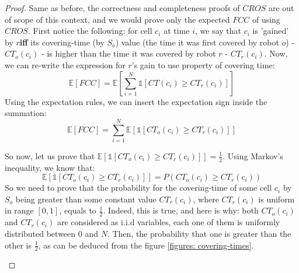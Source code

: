 \documentclass[letterpaper, 10 pt, conference]{ieeeconf}  %
\newtheorem{theorem}{Theorem}[section]
\newcommand\rob{\ensuremath{r}\xspace}
\newcommand\opp{\ensuremath{o}\xspace}
\newcommand{\fcc}{\ensuremath{FCC}\xspace}
\newcommand{\cros}{\ensuremath{CROS}\xspace}
\begin{document}
\begin{proof}
Same as before, the correctness and completeness proofs of \cros are out of scope of this context, and we would prove only the expected \fcc of using \cros.
First notice the following: for cell $c_i$ at time $i$, we say that $c_i$ is 'gained' by \rob \textbf{iff} its covering-time (by $S_o$) value (the time it was first covered by robot \opp) - ${CT}_{\opp}(c_i)$ - is higher than the time it was covered by robot $\rob$ - ${CT}_{\rob}(c_i)$.
Now, we can re-write the expression for \rob's gain to use property of covering time:
\begin{dmath*}
\mathbb{E}[\fcc]=\mathbb{E}\left[\sum_{i=1}^{N}{\mathds{1}\left[CT\left(c_i\right)\geq {CT}_{\rob}(c_i)\right]}\right]
\end{dmath*}
Using the expectation rules, we can insert the expectation sign inside the summation: \begin{dmath*}
\mathbb{E}[\fcc]=\sum_{i=1}^{N}{\mathbb{E}\left[\mathds{1}\left[{CT}_{\opp}(c_i)\geq {CT}_{\rob}(c_i)\right]\right]}
\end{dmath*}

So now, let us prove that $\mathbb{E}\left[\mathds{1}\left[{CT}_{\opp}(c_i)\geq {CT}_{\rob}(c_i)\right]\right]=\frac{1}{2}$. 
Using Markov's inequality, we know that: 
\begin{dmath*}[compact]
\mathbb{E}\left[\mathds{1}\left[{CT}_{\opp}(c_i)\geq {CT}_{\rob}(c_i)\right]\right]={P\left({CT}_{\opp}(c_i)\geq {CT}_{\rob}(c_i)\right)}
\end{dmath*}
So we need to prove that the probability for the covering-time of some cell $c_i$ by $S_{\opp}$ being greater than some constant value ${CT}_{\rob}(c_i)$, where ${CT}_{\rob}(c_i)$ is uniform in range $[0,1]$, equals to $\frac{1}{2}$.
Indeed, this is true, and here is why: both ${CT}_{\opp}(c_i)$ and ${CT}_{\rob}(c_i)$ are considered as i.i.d variables, each one of them is uniformly distributed between $0$ and $N$. Then, the probability that one is greater than the other is $\frac{1}{2}$, as can be deduced from the figure \ref{figures: covering-times}.

\begin{figure}[tb]
    \centering
\end{figure}
\end{proof}
\end{document}

